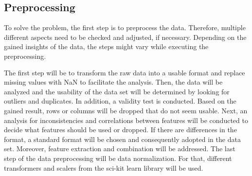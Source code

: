 \documentclass[11pt,titlepage,oneside,openany]{article}
\begin{document}
\subsection{Preprocessing}
%
%
%
To solve the problem, the first step is to preprocess the data. Therefore, multiple different aspects need to be checked and adjusted, if necessary. Depending on the gained insights of the data, the steps might vary while executing the preprocessing. 

The first step will be to transform the raw data into a usable format and replace missing values with NaN to facilitate the analysis.
Then, the data will be analyzed and the usability of the data set will be determined by looking for outliers and duplicates. In addition, a validity test is conducted. Based on the gained result, rows or columns will be dropped that do not seem usable. 
Next, an analysis for inconsistencies and correlations between features will be conducted to decide what features should be used or dropped. If there are differences in the format, a standard format will be chosen and consequently adopted in the data set.
Moreover, feature extraction and combination will be addressed. 
The last step of the data preprocessing will be data normalization. For that, different transformers and scalers from the sci-kit learn library will be used.
\end{document}
